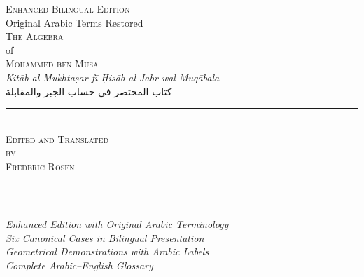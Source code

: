 


\thispagestyle{empty}
\begin{center}
\vspace*{1.5cm}

{\fontsize{12}{14}\selectfont\scshape\color{notecolor} Enhanced Bilingual Edition}\\[0.3cm]
{\fontsize{10}{12}\selectfont\color{notecolor} Original Arabic Terms Restored}\\[1cm]

{\fontsize{28}{34}\selectfont\scshape\color{titlecolor} The Algebra}\\[0.8cm]
{\fontsize{14}{18}\selectfont\color{sectioncolor} of}\\[0.8cm]
{\fontsize{28}{34}\selectfont\scshape\color{titlecolor} Mohammed ben Musa}\\[0.5cm]

{\large\color{sectioncolor}
\textit{Kit\=ab al-Mukhta\d{s}ar f\=i \d{H}is\=ab al-Jabr wal-Muq\=abala}}\\[0.3cm]
{\normalsize\arabicfont\beginR كتاب المختصر في حساب الجبر والمقابلة\endR}\\[1.5cm]

\rule{0.5\textwidth}{1pt}\\[1cm]

{\Large\scshape Edited and Translated}\\[0.3cm]
{\Large\scshape by}\\[0.3cm]
{\Large\scshape Frederic Rosen}\\[1.5cm]

\rule{0.5\textwidth}{1pt}\\[1cm]

\begin{minipage}{0.75\textwidth}
\centering
\small\color{prefacecolor}
\textit{Enhanced Edition with Original Arabic Terminology}\\[0.2cm]
\textit{Six Canonical Cases in Bilingual Presentation}\\[0.2cm]
\textit{Geometrical Demonstrations with Arabic Labels}\\[0.2cm]
\textit{Complete Arabic--English Glossary}
\end{minipage}


\end{center}
